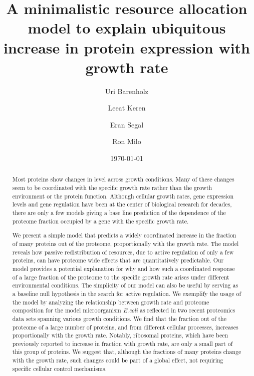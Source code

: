 \documentclass{article}
\title{A minimalistic resource allocation model to explain ubiquitous increase
in protein expression with growth rate}
\author{Uri Barenholz}
\author{Leeat Keren}
\author{Eran Segal}
\author{Ron Milo}
\affil{Weizmann Institute of Science}
\date{\today}
\begin{document}
\maketitle 

\begin{abstract}
Most proteins show changes in level across growth conditions. Many of
these changes seem to be coordinated with the specific growth rate
rather than the growth environment or the protein function. Although
cellular growth rates, gene expression levels and gene regulation have
been at the center of biological research for decades, there are only a
few models giving a base line prediction of the dependence of the
proteome fraction occupied by a gene with the specific growth rate.

We present a simple model that predicts a widely coordinated increase in
the fraction of many proteins out of the proteome, proportionally with
the growth rate. The model reveals how passive redistribution of
resources, due to active regulation of only a few proteins, can have
proteome wide effects that are quantitatively predictable. Our model
provides a potential explanation for why and how such a coordinated
response of a large fraction of the proteome to the specific growth rate
arises under different environmental conditions. The simplicity of our
model can also be useful by serving as a baseline null hypothesis in the
search for active regulation. We exemplify the usage of the model by
analyzing the relationship between growth rate and proteome composition
for the model microorganism \emph{E.coli} as reflected in two recent
proteomics data sets spanning various growth conditions. We find that
the fraction out of the proteome of a large number of proteins, and from
different cellular processes, increases proportionally with the growth
rate. Notably, ribosomal proteins, which have been previously reported
to increase in fraction with growth rate, are only a small part of this
group of proteins. We suggest that, although the fractions of many
proteins change with the growth rate, such changes could be part of a
global effect, not requiring specific cellular control mechanisms.

\end{abstract}
\end{document}

